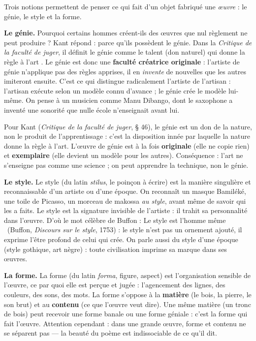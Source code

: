 \documentclass[11pt]{article}
\newcommand{\cle}[1]{{\popxbold\color{popdark}#1}}
\newcounter{popsec}
\newcounter{popsub}
\newcommand{\courssub}[1]{%
  \stepcounter{popsub}%
  \par\vspace{9pt}\noindent{\popxbold\fontsize{11.5}{13}\selectfont\color{popink}{\color{poporange}\thepopsec.\thepopsub}\hspace{6pt}#1}\par\nopagebreak\vspace{4pt}
}
\begin{document}
\courssub{Le génie, le style, la forme : les concepts de la création}

Trois notions permettent de penser ce qui fait d'un objet fabriqué une \emph{œuvre} : le génie, le style et la forme.

\textbf{Le génie.} Pourquoi certains hommes créent-ils des œuvres que nul règlement ne peut produire ? Kant répond : parce qu'ils possèdent le \cle{génie}. Dans la \emph{Critique de la faculté de juger}, il définit le génie comme \guillemotleft le talent (don naturel) qui donne la règle à l'art \guillemotright. Le génie est donc une \textbf{faculté créatrice originale} : l'artiste de génie n'applique pas des règles apprises, il en \emph{invente} de nouvelles que les autres imiteront ensuite. C'est ce qui distingue radicalement l'artiste de l'artisan : l'artisan exécute selon un modèle connu d'avance ; le génie crée le modèle lui-même. On pense à un musicien comme Manu Dibango, dont le saxophone a inventé une sonorité que nulle école n'enseignait avant lui.

\begin{propriete}
Pour Kant (\emph{Critique de la faculté de juger}, § 46), le génie est un don de la nature, non le produit de l'apprentissage : c'est la disposition innée par laquelle la nature donne la règle à l'art. L'œuvre de génie est à la fois \textbf{originale} (elle ne copie rien) et \textbf{exemplaire} (elle devient un modèle pour les autres). Conséquence : l'art ne s'enseigne pas comme une science ; on peut apprendre la technique, non le génie.
\end{propriete}

\textbf{Le style.} Le \cle{style} (du latin \emph{stilus}, le poinçon à écrire) est la manière singulière et reconnaissable d'un artiste ou d'une époque. On reconnaît un masque Bamiléké, une toile de Picasso, un morceau de makossa \emph{au style}, avant même de savoir qui les a faits. Le style est la signature invisible de l'artiste : il trahit sa personnalité dans l'œuvre. D'où le mot célèbre de Buffon : \guillemotleft Le style est l'homme même \guillemotright\ (Buffon, \emph{Discours sur le style}, 1753) : le style n'est pas un ornement ajouté, il exprime l'être profond de celui qui crée. On parle aussi du style d'une époque (style gothique, art nègre) : toute civilisation imprime sa marque dans ses œuvres.

\textbf{La forme.} La \cle{forme} (du latin \emph{forma}, figure, aspect) est l'organisation sensible de l'œuvre, ce par quoi elle est perçue et jugée : l'agencement des lignes, des couleurs, des sons, des mots. La forme s'oppose à la \textbf{matière} (le bois, la pierre, le son brut) et au \textbf{contenu} (ce que l'œuvre veut dire). Une même matière (un tronc de bois) peut recevoir une forme banale ou une forme géniale : c'est la forme qui fait l'œuvre. Attention cependant : dans une grande œuvre, forme et contenu ne se séparent pas — la beauté du poème est indissociable de ce qu'il dit.
\end{document}
